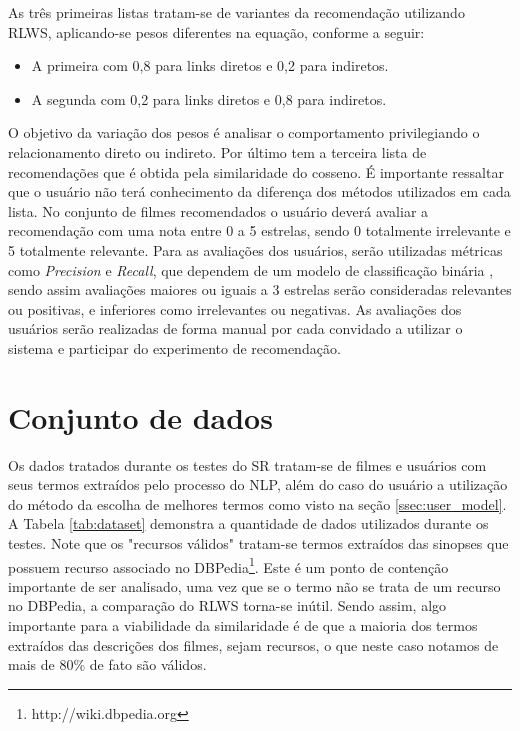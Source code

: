 As três primeiras listas tratam-se de variantes da recomendação utilizando \ac{RLWS}, aplicando-se pesos diferentes na equação, conforme a seguir: 

\begin{itemize}
	\item{A primeira com 0,8 para links diretos e 0,2 para indiretos.}
	\item{A segunda com 0,2 para links diretos e 0,8 para indiretos.}
\end{itemize}

O objetivo da variação dos pesos é analisar o comportamento privilegiando o relacionamento direto ou indireto. Por último tem a terceira lista de recomendações que é obtida pela similaridade do cosseno. É importante ressaltar que o usuário não terá conhecimento da diferença dos métodos utilizados em cada lista. No conjunto de filmes recomendados o usuário deverá avaliar a recomendação com uma nota entre 0 a 5 estrelas, sendo 0 totalmente irrelevante e 5 totalmente relevante. Para as avaliações dos usuários, serão utilizadas métricas como \textit{Precision} e \textit{Recall}, que dependem de um modelo de classificação binária \citep{Powers_2008}, sendo assim avaliações maiores ou iguais a 3 estrelas serão consideradas relevantes ou positivas, e inferiores como irrelevantes ou negativas. As avaliações dos usuários serão realizadas de forma manual por cada convidado a utilizar o sistema e participar do experimento de recomendação.

\section{Conjunto de dados}

Os dados tratados durante os testes do \ac{SR} tratam-se de filmes e usuários com seus termos extraídos pelo processo do \ac{NLP}, além do caso do usuário a utilização do método da escolha de melhores termos como visto na seção \ref{ssec:user_model}. A Tabela \ref{tab:dataset} demonstra a quantidade de dados utilizados durante os testes. Note que os "recursos válidos" tratam-se termos extraídos das sinopses que possuem recurso associado no DBPedia\footnote{http://wiki.dbpedia.org}. Este é um ponto de contenção importante de ser analisado, uma vez que se o termo não se trata de um recurso no DBPedia, a comparação do \ac{RLWS} torna-se inútil. Sendo assim, algo importante para a viabilidade da similaridade é de que a maioria dos termos extraídos das descrições dos filmes, sejam recursos, o que neste caso notamos de mais de 80\% de fato são válidos.

